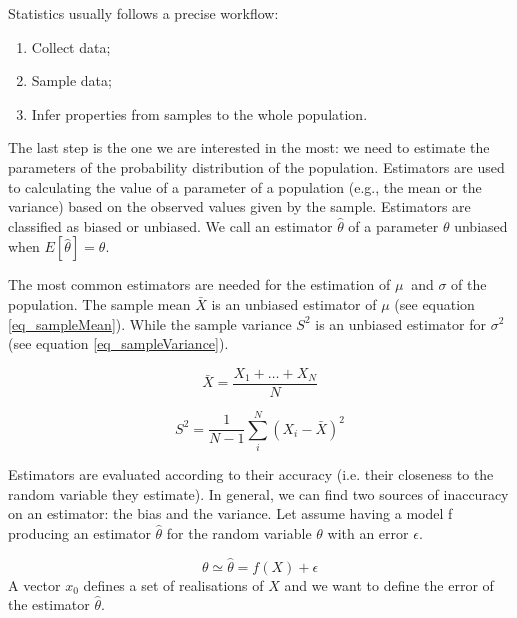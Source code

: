 Statistics usually follows a precise workflow:
\begin{enumerate}
    \item Collect data; 
    \item Sample data;
    \item Infer properties from samples to the whole population.
\end{enumerate}

The last step is the one we are interested in the most: we need to estimate the parameters of the probability distribution of the population. Estimators are used to calculating the value of a parameter of a population (e.g., the mean or the variance) based on the observed values given by the sample. Estimators are classified as biased or unbiased. We call an estimator $\hat{\theta}$ of a parameter $\theta$ unbiased when $E\left[\hat{\theta}\right]=\theta$.\par

The most common estimators are needed for the estimation of $\mu\ $ and $\sigma $ of the population. The sample mean $\bar{X}$ is an unbiased estimator of $\mu$ (see equation \ref{eq_sampleMean}). While the sample variance $S^2$ is an unbiased estimator for $\sigma^2$ (see equation \ref{eq_sampleVariance}).

\begin{equation}
\bar{X}=\frac{X_1+\ldots+X_N}{N}
\label{eq_sampleMean}
\end{equation}

\begin{equation}
S^2=\frac{1}{N-1}{\sum_{i}^{N}\left(X_i-\bar{X}\right)^2}
\label{eq_sampleVariance}
\end{equation}

Estimators are evaluated according to their accuracy (i.e. their closeness to the random variable they estimate). In general, we can find two sources of inaccuracy on an estimator: the bias and the variance. Let assume having a model f producing an estimator $\hat{\theta}$ for the random variable $\theta$ with an error $\epsilon$. 

\begin{equation}
\theta \simeq \hat{\theta}=f\left(X\right)+\epsilon
\label{eq_bias1}
\end{equation}
A vector $x_0$ defines a set of realisations of $X$ and we want to define the error of the estimator $\hat{\theta}$.

